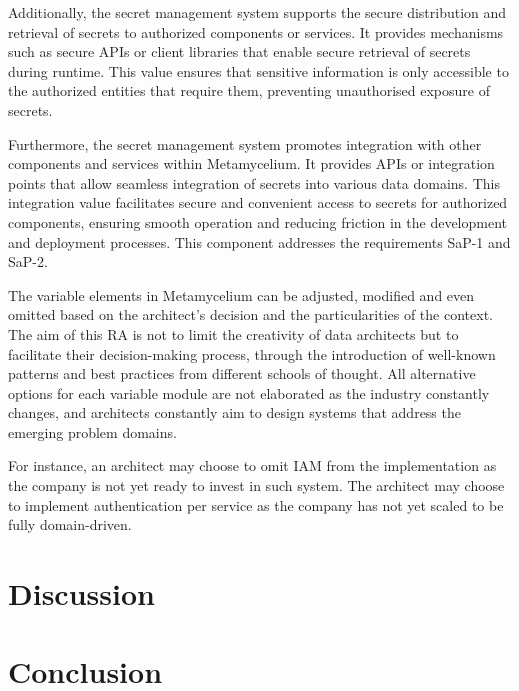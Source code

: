 \documentclass[preprint,12pt]{elsarticle}
\begin{document}
\begin{enumerate}
    Additionally, the secret management system supports the secure distribution and retrieval of secrets to authorized components or services. It provides mechanisms such as secure APIs or client libraries that enable secure retrieval of secrets during runtime. This value ensures that sensitive information is only accessible to the authorized entities that require them, preventing unauthorised exposure of secrets.
    
    Furthermore, the secret management system promotes integration with other components and services within Metamycelium. It provides APIs or integration points that allow seamless integration of secrets into various data domains. This integration value facilitates secure and convenient access to secrets for authorized components, ensuring smooth operation and reducing friction in the development and deployment processes. This component addresses the requirements SaP-1 and SaP-2. 



\end{enumerate}

The variable elements in Metamycelium can be adjusted, modified and even omitted based on the architect's decision and the particularities of the context. The aim of this RA is not to limit the creativity of data architects but to facilitate their decision-making process, through the introduction of well-known patterns and best practices from different schools of thought. All alternative options for each variable module are not elaborated as the industry constantly changes, and architects constantly aim to design systems that address the emerging problem domains. 

For instance, an architect may choose to omit IAM from the implementation as the company is not yet ready to invest in such system. The architect may choose to implement authentication per service as the company has not yet scaled to be fully domain-driven.

\section{Discussion}
\label{sec:discussion}

\section{Conclusion}
\label{sec:conclusion}




\appendix






\end{document}
